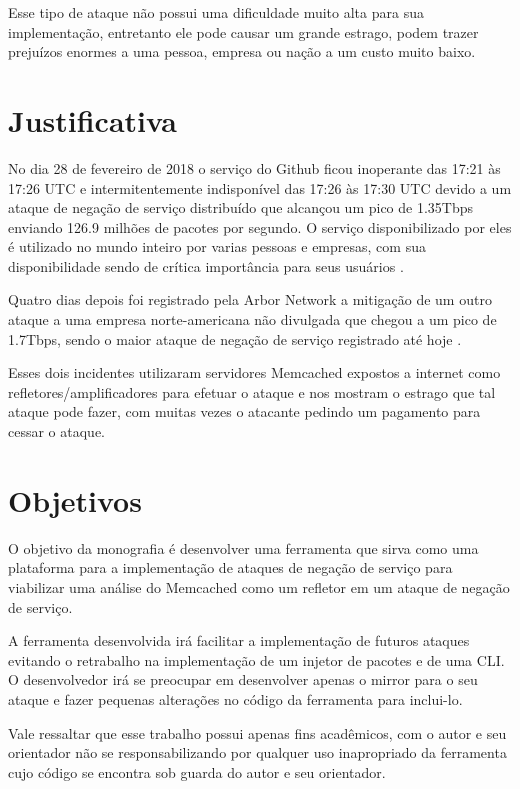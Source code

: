 Esse tipo de ataque não possui uma dificuldade muito alta para sua implementação, entretanto ele pode causar um grande estrago, podem trazer prejuízos enormes a uma pessoa, empresa ou nação a um custo muito baixo.

\section{Justificativa}

No dia 28 de fevereiro de 2018 o serviço do Github ficou inoperante das 17:21 às 17:26 UTC e intermitentemente indisponível das 17:26 às  17:30 UTC devido a um ataque de negação de serviço distribuído que alcançou um pico de 1.35Tbps enviando 126.9 milhões de pacotes por segundo. O serviço disponibilizado por eles é utilizado no mundo inteiro por varias pessoas e empresas, com sua disponibilidade sendo de crítica importância para seus usuários \cite{GitHubDDoS}.

Quatro dias depois foi registrado pela Arbor Network a mitigação de um outro ataque a uma empresa norte-americana não divulgada que chegou a um pico de 1.7Tbps, sendo o maior ataque de negação de serviço registrado até hoje \cite{LiamDDoS} \cite{cloudflareDDoS}.

Esses dois incidentes utilizaram servidores Memcached expostos a internet como refletores/amplificadores para efetuar o ataque e nos mostram o estrago que tal ataque pode fazer, com muitas vezes o atacante pedindo um pagamento para cessar o ataque.

\section{Objetivos}

O objetivo da monografia é desenvolver uma ferramenta que sirva como uma plataforma para a implementação de ataques de negação de serviço para viabilizar uma análise do Memcached como um refletor em um ataque de negação de serviço.

A ferramenta desenvolvida irá facilitar a implementação de futuros ataques evitando o retrabalho na implementação de um injetor de pacotes e de uma \acrfull{CLI}. O desenvolvedor irá se preocupar em desenvolver apenas o mirror para o seu ataque e fazer pequenas alterações no código da ferramenta para inclui-lo.

Vale ressaltar que esse trabalho possui apenas fins acadêmicos, com o autor e seu orientador não se responsabilizando por qualquer uso inapropriado da ferramenta cujo código se encontra sob guarda do autor e seu orientador.

